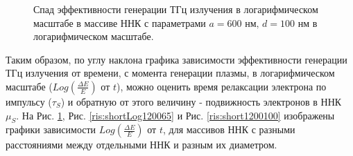 \documentclass[a4paper,14pt,russian]{extreport}
\begin{document}
				\begin{figure}[H]
					\caption{Спад эффективности генерации ТГц излучения в логарифмическом масштабе в массиве ННК с параметрами $a = 600 \text{ нм, } d = 100 \text{ нм}$ в логарифмическом масштабе.}
				\label{ris:shortLog600100}
				\end{figure}
				Таким образом, по углу наклона графика зависимости эффективности генерации ТГц излучения от времени, с момента генерации плазмы, в логарифмическом масштабе ($Log\left(\frac{\Delta E}{E}\right)$ от $t$), можно оценить время релаксации электрона по импульсу ($\tau_S$) и обратную от этого величину - подвижность электронов в ННК $\mu_S$. На Рис. \ref{ris:shortLog600100}, Рис. \ref{ris:shortLog120065} и Рис. \ref{ris:short1200100} изображены графики зависимости $Log\left(\frac{\Delta E}{E}\right)$ от $t$, для массивов ННК с разными расстояниями между отдельными ННК и разным их диаметром.\par
\end{document}
